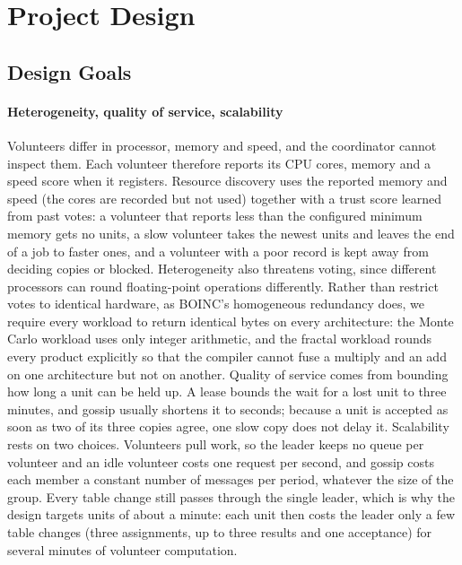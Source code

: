 \section{Project Design}
\label{sec:design}

\subsection{Design Goals}
\label{sec:design-goals}

\paragraph{Heterogeneity, quality of service, scalability}
Volunteers differ in processor, memory and speed, and the coordinator cannot inspect them. Each volunteer therefore reports its CPU cores, memory and a speed score when it registers. Resource discovery uses the reported memory and speed (the cores are recorded but not used) together with a trust score learned from past votes: a volunteer that reports less than the configured minimum memory gets no units, a slow volunteer takes the newest units and leaves the end of a job to faster ones, and a volunteer with a poor record is kept away from deciding copies or blocked. Heterogeneity also threatens voting, since different processors can round floating-point operations differently. Rather than restrict votes to identical hardware, as BOINC's homogeneous redundancy does, we require every workload to return identical bytes on every architecture: the Monte Carlo workload uses only integer arithmetic, and the fractal workload rounds every product explicitly so that the compiler cannot fuse a multiply and an add on one architecture but not on another. Quality of service comes from bounding how long a unit can be held up. A lease bounds the wait for a lost unit to three minutes, and gossip usually shortens it to seconds; because a unit is accepted as soon as two of its three copies agree, one slow copy does not delay it. Scalability rests on two choices. Volunteers pull work, so the leader keeps no queue per volunteer and an idle volunteer costs one request per second, and gossip costs each member a constant number of messages per period, whatever the size of the group. Every table change still passes through the single leader, which is why the design targets units of about a minute: each unit then costs the leader only a few table changes (three assignments, up to three results and one acceptance) for several minutes of volunteer computation.

